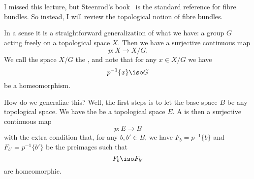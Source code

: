 
I missed this lecture, but Steenrod's book~\cite{steenrod} is the
standard reference for fibre bundles. So instead, I will review
the topological notion of fibre bundles. 

In a sense it is a straightforward generalization of what we
have: a group $G$ acting freely on a topological space $X$. Then
we have a surjective continuous map 
\begin{equation}
p\colon X\to X/G. 
\end{equation}
We call the space $X/G$ the , and note that
for any $x\in X/G$ we have
\begin{equation}
p^{-1}\{x\}\iso G
\end{equation}
be a homeomorphism. 

How do we generalize this? Well, the first steps is to let the
base space $B$ be any topological space. We have
the 
be a topological space $E$. A 
is then a surjective continuous map
\begin{equation}
p\colon E\to B
\end{equation}
with the extra condition that, for any $b,b'\in B$, we have
$F_{b}=p^{-1}\{b\}$ and $F_{b'}=p^{-1}\{b'\}$ be the preimages
such that
\begin{equation}
F_{b}\iso F_{b'}
\end{equation}
are homeomorphic. 

